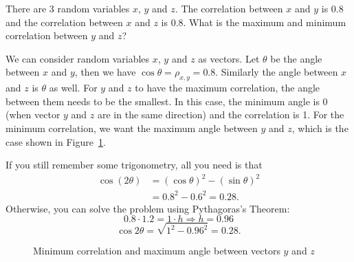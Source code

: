 \begin{problem}{There are 3 random variables $x$, $y$ and $z$. The correlation between $x$ and $y$
is 0.8 and the correlation between $x$ and $z$ is 0.8. What is the maximum and minimum
correlation between $y$ and $z$?}
\end{problem}
\begin{solution}
We can consider random variables $x$, $y$ and $z$ as vectors. Let $\theta$ be the angle
between $x$ and $y$, then we have $\cos\theta=\rho_{x,y}=0.8$. Similarly the angle
between $x$ and $z$ is $\theta$ as well. For $y$ and $z$ to have the maximum correlation,
the angle between them needs to be the smallest. In this case, the minimum angle is 0
(when vector $y$ and $z$ are in the same direction) and the correlation is 1. For the
minimum correlation, we want the maximum angle between $y$ and $z$, which is the case
shown in Figure~\ref{fig:zhou-figure-3-2}.

If you still remember some trigonometry, all you need is that
\[
\begin{aligned}
\cos(2\theta)&=(\cos\theta)^2-(\sin\theta)^2\\
 &=0.8^2-0.6^2=0.28.
\end{aligned}
\]
Otherwise, you can solve the problem using Pythagoras's Theorem:
\[
0.8\cdot1.2=1\cdot h\Rightarrow h=0.96
\]
\[
\cos2\theta=\sqrt{1^2-0.96^2}=0.28.
\]

\begin{figure}[ht]
\centering
{}
\caption{Minimum correlation and maximum angle between vectors $y$ and $z$}
\label{fig:zhou-figure-3-2}
\end{figure}
\end{solution}

